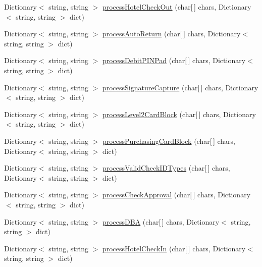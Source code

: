 \begin{DoxyCompactItemize}
\item 
Dictionary$<$ string, string $>$ \mbox{\hyperlink{class_form_sim_1_1_t_c_p_handler_a17c1a29be83e58752274a3ecb4d0c42d}{process\+Hotel\+Check\+Out}} (char\mbox{[}$\,$\mbox{]} chars, Dictionary$<$ string, string $>$ dict)
\item 
Dictionary$<$ string, string $>$ \mbox{\hyperlink{class_form_sim_1_1_t_c_p_handler_ab4fa317e40b02689b23b6decc5c4dd23}{process\+Auto\+Return}} (char\mbox{[}$\,$\mbox{]} chars, Dictionary$<$ string, string $>$ dict)
\item 
Dictionary$<$ string, string $>$ \mbox{\hyperlink{class_form_sim_1_1_t_c_p_handler_abee335961452418d460a7ae488ae3eb0}{process\+Debit\+P\+I\+N\+Pad}} (char\mbox{[}$\,$\mbox{]} chars, Dictionary$<$ string, string $>$ dict)
\item 
Dictionary$<$ string, string $>$ \mbox{\hyperlink{class_form_sim_1_1_t_c_p_handler_a26fb8948369426871f17ee0df07f9fae}{process\+Signature\+Capture}} (char\mbox{[}$\,$\mbox{]} chars, Dictionary$<$ string, string $>$ dict)
\item 
Dictionary$<$ string, string $>$ \mbox{\hyperlink{class_form_sim_1_1_t_c_p_handler_a68b477773fadcaaea8be6b8da1bfb0a5}{process\+Level2\+Card\+Block}} (char\mbox{[}$\,$\mbox{]} chars, Dictionary$<$ string, string $>$ dict)
\item 
Dictionary$<$ string, string $>$ \mbox{\hyperlink{class_form_sim_1_1_t_c_p_handler_afe54793d0d46b51163edf79a9733d6dd}{process\+Purchasing\+Card\+Block}} (char\mbox{[}$\,$\mbox{]} chars, Dictionary$<$ string, string $>$ dict)
\item 
Dictionary$<$ string, string $>$ \mbox{\hyperlink{class_form_sim_1_1_t_c_p_handler_a8f376aac84832a975e0a9334e2c208c5}{process\+Valid\+Check\+I\+D\+Types}} (char\mbox{[}$\,$\mbox{]} chars, Dictionary$<$ string, string $>$ dict)
\item 
Dictionary$<$ string, string $>$ \mbox{\hyperlink{class_form_sim_1_1_t_c_p_handler_af873827846e56cca37deb08de148c725}{process\+Check\+Approval}} (char\mbox{[}$\,$\mbox{]} chars, Dictionary$<$ string, string $>$ dict)
\item 
Dictionary$<$ string, string $>$ \mbox{\hyperlink{class_form_sim_1_1_t_c_p_handler_ac7fbe43d4623f2e14fc97882986e77c9}{process\+D\+BA}} (char\mbox{[}$\,$\mbox{]} chars, Dictionary$<$ string, string $>$ dict)
\item 
Dictionary$<$ string, string $>$ \mbox{\hyperlink{class_form_sim_1_1_t_c_p_handler_a42197084105edea21d65254ed1fc8ce4}{process\+Hotel\+Check\+In}} (char\mbox{[}$\,$\mbox{]} chars, Dictionary$<$ string, string $>$ dict)

\end{DoxyCompactItemize}
